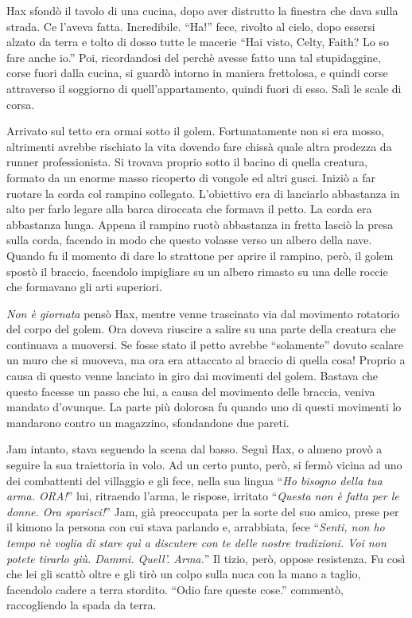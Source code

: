     Hax sfondò il tavolo di una cucina, dopo aver distrutto la finestra che
    dava sulla strada. Ce l'aveva fatta. Incredibile. ``Ha!'' fece, rivolto
    al cielo, dopo essersi alzato da terra e tolto di dosso tutte le
    macerie ``Hai visto, Celty, Faith? Lo so fare anche io.'' Poi,
    ricordandosi del perchè avesse fatto una tal stupidaggine, corse fuori
    dalla cucina, si guardò intorno in maniera frettolosa, e quindi corse
    attraverso il soggiorno di quell'appartamento, quindi fuori di esso.
    Salì le scale di corsa.

    Arrivato sul tetto era ormai sotto il golem. Fortunatamente non si era
    mosso, altrimenti avrebbe rischiato la vita dovendo fare chissà quale
    altra prodezza da runner professionista. Si trovava proprio sotto il
    bacino di quella creatura, formato da un enorme masso ricoperto di vongole
    ed altri gusci. Iniziò a far ruotare la corda col rampino collegato.
    L'obiettivo era di lanciarlo abbastanza in alto per farlo legare alla
    barca  diroccata che formava il petto. La corda era abbastanza lunga.
    Appena il rampino ruotò abbastanza in fretta lasciò la presa sulla
    corda, facendo in modo che questo volasse verso un albero della nave.
    Quando fu il momento di dare lo strattone per aprire il rampino, però,
    il golem spostò il braccio, facendolo impigliare su un albero rimasto
    su una delle roccie che formavano gli arti superiori.

    \emph{Non è giornata} pensò Hax, mentre venne trascinato via dal
    movimento rotatorio del corpo del golem. Ora doveva riuscire a salire
    su una parte della creatura che continuava a muoversi. Se fosse stato
    il petto avrebbe ``solamente'' dovuto scalare un muro che si muoveva,
    ma ora era attaccato al braccio di quella cosa! Proprio a causa di
    questo venne lanciato in giro dai movimenti del golem. Bastava che
    questo facesse un passo che lui, a causa del movimento delle braccia,
    veniva mandato d'ovunque. La parte più dolorosa fu quando uno di questi
    movimenti lo mandarono contro un magazzino, sfondandone due pareti.
  
    Jam intanto, stava seguendo la scena dal basso. Seguì Hax, o almeno
    provò a seguire la sua traiettoria in volo. Ad un certo punto, però,
    si fermò vicina ad uno dei combattenti del villaggio e gli fece, nella
    sua lingua ``\emph{Ho bisogno della tua arma. ORA!}'' lui, ritraendo
    l'arma, le rispose, irritato ``\emph{Questa non è fatta per le donne.
    Ora sparisci!}'' Jam, già preoccupata per la sorte del suo amico, prese
    per il kimono la persona con cui stava parlando e, arrabbiata, fece
    ``\emph{Senti, non ho tempo nè voglia di stare quì a discutere con te
    delle nostre tradizioni. Voi non potete tirarlo giù. Dammi. Quell'.
    Arma.}'' Il tizio, però, oppose resistenza. Fu così che lei gli scattò
    oltre e gli tirò un colpo sulla nuca con la mano a taglio, facendolo
    cadere a terra stordito. ``Odio fare queste cose.'' commentò,
    raccogliendo la spada da terra.

